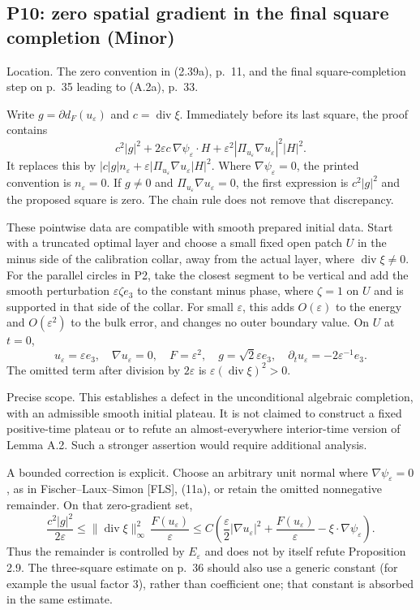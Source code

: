 \documentclass[10pt]{article}
\begin{document}
\subsection*{P10: zero spatial gradient in the final square completion (Minor)}
Location. The zero convention in (2.39a), p. 11, and the final square-completion step on p. 35 leading to (A.2a), p. 33.\par
Write \(g=\partial d_F(u_\varepsilon)\) and \(c=\operatorname{div}\xi\). Immediately before its last square, the proof contains \[c^2|g|^2+2\varepsilon c\,\nabla\psi_\varepsilon\cdot H
             +\varepsilon^2|\Pi_{u_\varepsilon}\nabla u_\varepsilon|^2|H|^2.\] It replaces this by \(|c|g|n_\varepsilon+\varepsilon|\Pi_{u_\varepsilon}\nabla u_\varepsilon|H|^2\). Where \(\nabla\psi_\varepsilon=0\), the printed convention is \(n_\varepsilon=0\). If \(g\neq0\) and \(\Pi_{u_\varepsilon}\nabla u_\varepsilon=0\), the first expression is \(c^2|g|^2\) and the proposed square is zero. The chain rule does not remove that discrepancy.\par
These pointwise data are compatible with smooth prepared initial data. Start with a truncated optimal layer and choose a small fixed open patch \(U\) in the minus side of the calibration collar, away from the actual layer, where \(\operatorname{div}\xi\neq0\). For the parallel circles in P2, take the closest segment to be vertical and add the smooth perturbation \(\varepsilon\zeta e_3\) to the constant minus phase, where \(\zeta=1\) on \(U\) and is supported in that side of the collar. For small \(\varepsilon\), this adds \(O(\varepsilon)\) to the energy and \(O(\varepsilon^2)\) to the bulk error, and changes no outer boundary value. On \(U\) at \(t=0\), \[u_\varepsilon=\varepsilon e_3,\quad \nabla u_\varepsilon=0,\quad
 F=\varepsilon^2,\quad g=\sqrt2\varepsilon e_3,\quad
 \partial_tu_\varepsilon=-2\varepsilon^{-1}e_3.\] The omitted term after division by \(2\varepsilon\) is \(\varepsilon(\operatorname{div}\xi)^2>0\).\par
Precise scope. This establishes a defect in the unconditional algebraic completion, with an admissible smooth initial plateau. It is not claimed to construct a fixed positive-time plateau or to refute an almost-everywhere interior-time version of Lemma A.2. Such a stronger assertion would require additional analysis.\par
A bounded correction is explicit. Choose an arbitrary unit normal where \(\nabla\psi_\varepsilon=0\), as in Fischer–Laux–Simon [FLS], (11a), or retain the omitted nonnegative remainder. On that zero-gradient set, \[\frac{c^2|g|^2}{2\varepsilon}
 \leq \|\operatorname{div}\xi\|_\infty^2\,\frac{F(u_\varepsilon)}{\varepsilon}
 \leq C\left(\frac{\varepsilon}{2}|\nabla u_\varepsilon|^2+
                    \frac{F(u_\varepsilon)}{\varepsilon}
                    -\xi\cdot\nabla\psi_\varepsilon\right).\] Thus the remainder is controlled by \(E_\varepsilon\) and does not by itself refute Proposition 2.9. The three-square estimate on p. 36 should also use a generic constant (for example the usual factor \(3\)), rather than coefficient one; that constant is absorbed in the same estimate.\par
\end{document}
